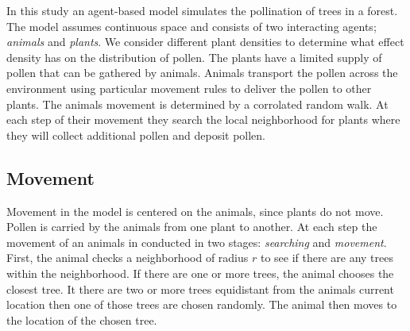In this study an agent-based model simulates the pollination of trees in a forest. The model assumes
continuous space and consists of two interacting agents; \emph{animals} and \emph{plants}.  We
consider different plant densities to determine what effect density has on the distribution of
pollen.  The plants have a limited supply of pollen that can be gathered by animals.  Animals
transport the pollen across the environment using particular movement rules to deliver the pollen to
other plants.  The animals movement is determined by a corrolated random walk.  At each step of
their movement they search the local neighborhood for plants where they will collect additional
pollen and deposit pollen.

\subsection{Movement} 
  Movement in the model is centered on the animals, since plants do not move.  Pollen is carried by
  the animals from one plant to another. At each step the movement of an animals in conducted in two
  stages: \emph{ searching} and \emph{ movement}.  First, the animal checks a neighborhood of radius
  $r$ to see if there are any trees within the neighborhood.  If there are one or more trees, 
  the animal chooses the closest tree.  It there are two or more trees equidistant from the animals
  current location then one of those trees are chosen randomly.  The animal then moves to the
  location of the chosen tree.

